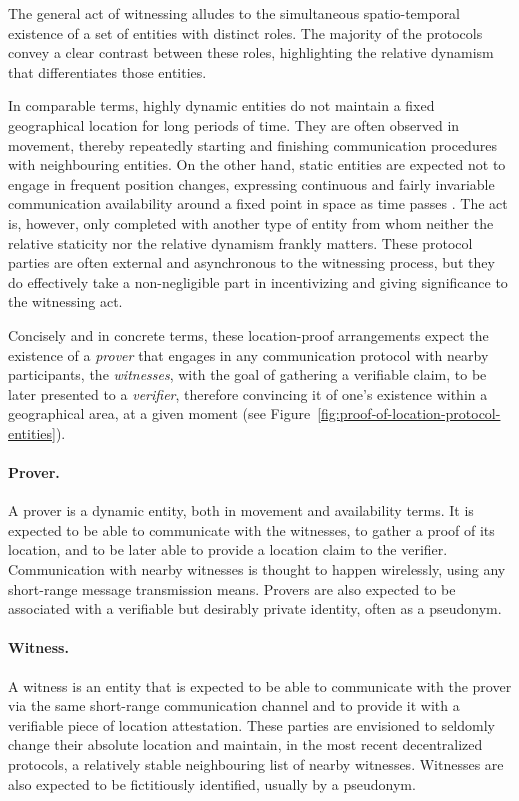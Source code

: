 The general act of witnessing alludes to the simultaneous spatio-temporal existence of a set of entities with distinct roles. The majority of the protocols convey a clear contrast between these roles, highlighting the relative dynamism that differentiates those entities. 

In comparable terms, highly dynamic entities do not maintain a fixed geographical location for long periods of time. They are often observed in movement, thereby repeatedly starting and finishing communication procedures with neighbouring entities. On the other hand, static entities are expected not to engage in frequent position changes, expressing continuous and fairly invariable communication availability around a fixed point in space as time passes \cite{nasrulin2018robust}. The act is, however, only completed with another type of entity from whom neither the relative staticity nor the relative dynamism frankly matters. These protocol parties are often external and asynchronous to the witnessing process, but they do effectively take a non-negligible part in incentivizing and giving significance to the witnessing act. 

Concisely and in concrete terms, these location-proof arrangements expect the existence of a \emph{prover} that engages in any communication protocol with nearby participants, the \emph{witnesses}, with the goal of gathering a verifiable \pol{} claim, to be later presented to a \emph{verifier}, therefore convincing it of one's existence within a geographical area, at a given moment \cite{dupin2018location} (see Figure~\ref{fig:proof-of-location-protocol-entities}).

\paragraph{Prover.} A prover is a dynamic entity, both in movement and availability terms. It is expected to be able to communicate with the witnesses, to gather a proof of its location, and to be later able to provide a location claim to the verifier. Communication with nearby witnesses is thought to happen wirelessly, using any short-range message transmission means. Provers are also expected to be associated with a verifiable but desirably private identity, often as a pseudonym.

\paragraph{Witness.} A witness is an entity that is expected to be able to communicate with the prover via the same short-range communication channel and to provide it with a verifiable piece of location attestation. These parties are envisioned to seldomly change their absolute location and maintain, in the most recent decentralized protocols, a relatively stable neighbouring list of nearby witnesses. Witnesses are also expected to be fictitiously identified, usually by a pseudonym.

